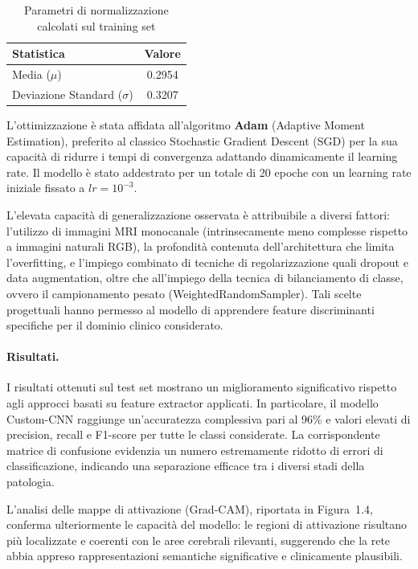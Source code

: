 \begin{table}[h!]
\centering
\begin{tabular}{lc}
\hline
\textbf{Statistica} & \textbf{Valore} \\
\hline
Media ($\mu$) & 0.2954 \\
Deviazione Standard ($\sigma$) & 0.3207 \\
\hline
\end{tabular}
\caption{Parametri di normalizzazione calcolati sul training set}
\label{tab:normalization_stats}
\end{table}


L’ottimizzazione è stata affidata all’algoritmo \textbf{Adam} (Adaptive Moment Estimation), preferito al classico Stochastic Gradient Descent (SGD) per la sua capacità di ridurre i tempi di convergenza adattando dinamicamente il learning rate. Il modello è stato addestrato per un totale di 20 epoche con un learning rate iniziale fissato a $lr = 10^{-3}$.

L’elevata capacità di generalizzazione osservata è attribuibile a diversi fattori: l’utilizzo di immagini MRI monocanale (intrinsecamente meno complesse rispetto a immagini naturali RGB), la profondità contenuta dell’architettura che limita l’overfitting, e l’impiego combinato di tecniche di regolarizzazione quali dropout e data augmentation, oltre che all'impiego della tecnica di bilanciamento di classe, ovvero il campionamento pesato (WeightedRandomSampler). Tali scelte progettuali hanno permesso al modello di apprendere feature discriminanti specifiche per il dominio clinico considerato.

\paragraph{Risultati.}
I risultati ottenuti sul test set mostrano un miglioramento significativo rispetto agli approcci basati su feature extractor applicati. In particolare, il modello Custom-CNN raggiunge un’accuratezza complessiva pari al 96\% e valori elevati di precision, recall e F1-score per tutte le classi considerate. La corrispondente matrice di confusione evidenzia un numero estremamente ridotto di errori di classificazione, indicando una separazione efficace tra i diversi stadi della patologia.

L’analisi delle mappe di attivazione (Grad-CAM), riportata in Figura~1.4, conferma ulteriormente le capacità del modello: le regioni di attivazione risultano più localizzate e coerenti con le aree cerebrali rilevanti, suggerendo che la rete abbia appreso rappresentazioni semantiche significative e clinicamente plausibili.


